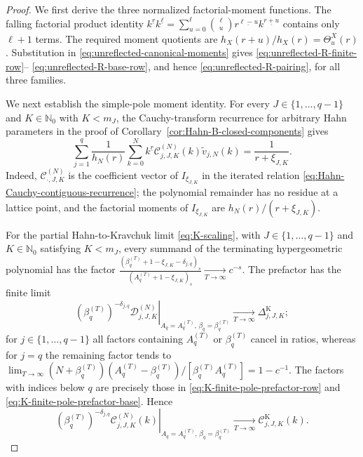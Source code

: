 \documentclass[10pt]{amsart}
\newcommand{\Nzero}{\mathbb N_0}
\newcommand{\fall}[2]{#1^{\underline{#2}}}
\theoremstyle{plain}
\theoremstyle{definition}
\theoremstyle{remark}
\begin{document}
\begin{proof}
We first derive the three normalized factorial-moment functions. The falling
factorial product identity
\(\fall{k}{r}\fall{k}{\ell}
=\sum_{u=0}^{\ell}\binom\ell u
\fall{r}{\ell-u}\fall{k}{r+u}\)
contains only \(\ell+1\) terms. The required moment quotients are
\(h_X(r+u)/h_X(r)=\Theta_u^X(r)\).
Substitution in \eqref{eq:unreflected-canonical-moments} gives
\eqref{eq:unreflected-R-finite-row}--
\eqref{eq:unreflected-R-base-row}, and hence
\eqref{eq:unreflected-R-pairing}, for all three families.

We next establish the simple-pole moment identity. For every
\(J\in\{1,\ldots,q-1\}\) and \(K\in\Nzero\) with \(K<m_J\), the
Cauchy-transform recurrence for arbitrary Hahn parameters in the proof of
Corollary~\ref{cor:Hahn-B-closed-components} gives
\begin{equation}
 \sum_{j=1}^q\frac1{h_N(r)}
 \sum_{k=0}^N\fall{k}{r}
 \mathcal C_{j,J,K}^{(N)}(k)
 \widetilde v_{j,N}(k)
 =\frac1{r+\xi_{J,K}}.
 \label{eq:unreflected-Hahn-pairing}
\end{equation}
Indeed, \(\mathcal C_{\cdot,J,K}^{(N)}\) is the coefficient vector of
\(I_{\xi_{J,K}}\) in the iterated relation
\eqref{eq:Hahn-Cauchy-contiguous-recurrence}; the polynomial remainder
has no residue at a lattice point, and the factorial moments of
\(I_{\xi_{J,K}}\) are
\(h_N(r)/(r+\xi_{J,K})\).

For the partial Hahn-to-Kravchuk limit
\eqref{eq:K-scaling}, with \(J\in\{1,\ldots,q-1\}\) and
\(K\in\Nzero\) satisfying \(K<m_J\), every summand of the terminating
hypergeometric polynomial has the factor
\(\frac{(\beta_q^{(T)}+1-\xi_{J,K}-\delta_{j,q})_s}
{(A_q^{(T)}+1-\xi_{J,K})_s}
\xrightarrow[T\to\infty]{}c^{-s}\).
The prefactor has the finite limit
\[
 \left.
 (\beta_q^{(T)})^{-\delta_{j,q}}
 \mathcal D_{j,J,K}^{(N)}
 \right|_{A_q=A_q^{(T)},\,\beta_q=\beta_q^{(T)}}
 \xrightarrow[T\to\infty]{}\Delta_{j,J,K}^{\mathrm K};
\]
for \(j\in\{1,\ldots,q-1\}\) all factors containing \(A_q^{(T)}\) or
\(\beta_q^{(T)}\) cancel in ratios, whereas for \(j=q\) the remaining
factor tends to
\(\lim_{T\to\infty}(N+\beta_q^{(T)})(A_q^{(T)}-\beta_q^{(T)})/
[\beta_q^{(T)}A_q^{(T)}]=1-c^{-1}\).
The factors with indices below \(q\) are precisely those in
\eqref{eq:K-finite-pole-prefactor-row} and
\eqref{eq:K-finite-pole-prefactor-base}.  Hence
\[
 \left.
 (\beta_q^{(T)})^{-\delta_{j,q}}
 \mathcal C_{j,J,K}^{(N)}(k)
 \right|_{A_q=A_q^{(T)},\,\beta_q=\beta_q^{(T)}}
 \xrightarrow[T\to\infty]{}\mathcal C_{j,J,K}^{\mathrm K}(k).
\]


\end{proof}
\end{document}
